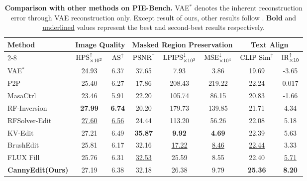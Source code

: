 \documentclass{article}
\begin{document}
\begin{table}[h]

\begin{center} 
\footnotesize
\setlength{\tabcolsep}{1.85mm} %
\caption{\textbf{Comparison with other methods on PIE-Bench.} VAE$^*$ denotes the inherent reconstruction error through VAE reconstruction only. Except result of ours, other results follow \cite{zhu2025kv}. \textbf{Bold} and \underline{underlined} values represent the best and second-best results respectively.}
\begin{tabular}{l|cc|ccc|cc}
\toprule
\multirow{3}{*}[0.8ex]{Method} & \multicolumn{2}{c|}{Image Quality} & \multicolumn{3}{c|}{Masked Region Preservation} &\multicolumn{2}{c}{Text Align} \\
\cmidrule(lr){2-8} & $\textup{HPS}_{\times 10^2}^{\uparrow}$ & $\textup{AS}^{\uparrow}$ & $\textup{PSNR}^\uparrow$ & $\textup{LPIPS}_{\times 10^3}^{\downarrow}$ & $\textup{MSE}_{\times 10^4}^{\downarrow}$ & $\textup{CLIP Sim}^{\uparrow}$ & $\textup{IR}_{\times10}^{\uparrow}$\\
\midrule
VAE$^*$ & 24.93 & 6.37 & 37.65 & 7.93 & 3.86 & 19.69 & -3.65\\
\midrule
P2P~\cite{hertz2022prompt} & 25.40 & 6.27& 17.86 & 208.43 & 219.22 & 22.24 & 0.017 \\
MasaCtrl~\cite{cao2023masactrl} & 23.46 & 5.91 & 22.20 & 105.74 & 86.15 & 20.83 & -1.66\\
RF-Inversion~\cite{rout2024semantic} & \textbf{27.99} & \textbf{6.74} & 20.20 & 179.73 & 139.85 & 21.71 & 4.34\\
RFSolver-Edit~\cite{wang2024taming} & \underline{27.60} & \underline{6.56}& 24.44& 113.20& 56.26& 22.08& 5.18\\
KV-Edit~\cite{zhu2025kv} & 27.21 & 6.49 & \textbf{35.87}& \textbf{9.92}& \textbf{4.69}& 22.39 & 5.63\\
BrushEdit~\cite{li2024brushedit} & 25.81 & 6.17 & 32.16 & \underline{17.22} & \underline{8.46} & \underline{22.44} & 3.33\\
FLUX Fill~\cite{blackforest2024FLUX} & 25.76 & 6.31 & \underline{32.53} & 25.59 & 8.55 & 22.40 & \underline{5.71}\\
\midrule
\textbf{CannyEdit(Ours)} & 27.19 & 6.38 & 32.18 & 26.38 & 9.79& \textbf{25.36} & \textbf{8.20}\\
\bottomrule
\end{tabular}
\label{tab:pie-comparison} 
\end{center}
\end{table}
\end{document}
